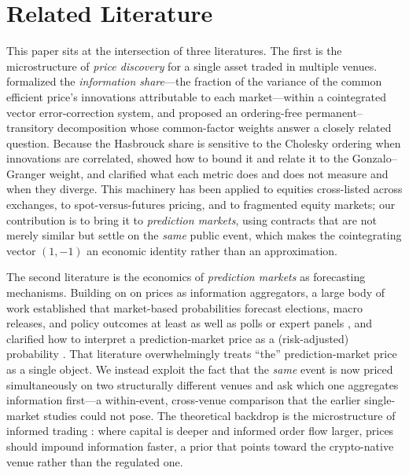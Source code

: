 \documentclass[12pt]{article}
\begin{document}
\section{Related Literature}\label{sec:lit}
This paper sits at the intersection of three literatures. The first is the microstructure of
\emph{price discovery} for a single asset traded in multiple venues. \citet{hasbrouck1995}
formalized the \emph{information share}---the fraction of the variance of the common efficient
price's innovations attributable to each market---within a cointegrated vector error-correction
system, and \citet{gonzalo1995} proposed an ordering-free permanent--transitory decomposition
whose common-factor weights answer a closely related question. Because the Hasbrouck share is
sensitive to the Cholesky ordering when innovations are correlated, \citet{baillie2002} showed
how to bound it and relate it to the Gonzalo--Granger weight, and \citet{putnins2013} clarified
what each metric does and does not measure and when they diverge. This machinery has been applied
to equities cross-listed across exchanges, to spot-versus-futures pricing, and to fragmented
equity markets; our contribution is to bring it to \emph{prediction markets}, using contracts
that are not merely similar but settle on the \emph{same} public event, which makes the
cointegrating vector $(1,-1)$ an economic identity rather than an approximation.

The second literature is the economics of \emph{prediction markets} as forecasting mechanisms.
Building on \citet{hayek1945} on prices as information aggregators, a large body of work
established that market-based probabilities forecast elections, macro releases, and policy
outcomes at least as well as polls or expert panels \citep{wolfers2004,berg2008,snowberg2013},
and clarified how to interpret a prediction-market price as a (risk-adjusted) probability
\citep{manski2006,rhode2004}. That literature overwhelmingly treats ``the'' prediction-market
price as a single object. We instead exploit the fact that the \emph{same} event is now priced
simultaneously on two structurally different venues and ask which one aggregates information
first---a within-event, cross-venue comparison that the earlier single-market studies could not
pose. The theoretical backdrop is the microstructure of informed trading \citep{kyle1985}: where
capital is deeper and informed order flow larger, prices should impound information faster, a
prior that points toward the crypto-native venue rather than the regulated one.
\end{document}
